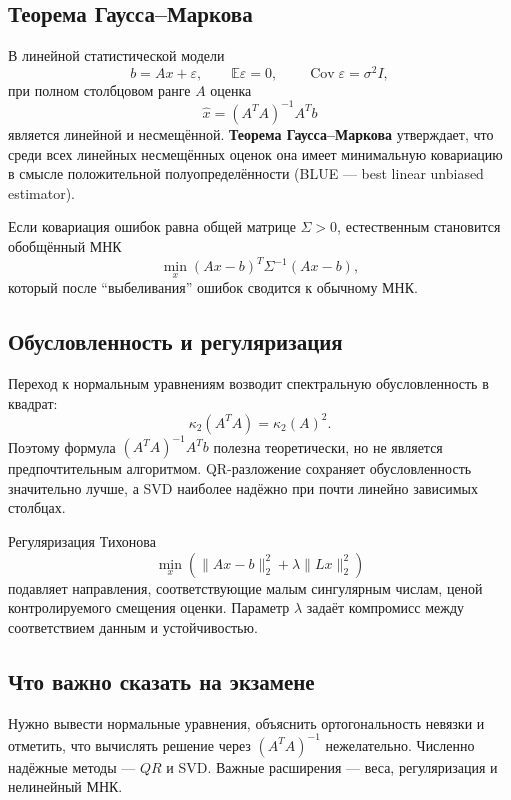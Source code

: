 \subsection{Теорема Гаусса--Маркова}

В линейной статистической модели
\[
    b=Ax+\varepsilon,
    \qquad
    \mathbb E\varepsilon=0,
    \qquad
    \operatorname{Cov}\varepsilon=\sigma^2I,
\]
при полном столбцовом ранге $A$ оценка
\[
    \widehat x=(A^TA)^{-1}A^Tb
\]
является линейной и несмещённой. \textbf{Теорема Гаусса--Маркова} утверждает, что среди
всех линейных несмещённых оценок она имеет минимальную ковариацию в смысле
положительной полуопределённости (BLUE --- best linear unbiased estimator).

Если ковариация ошибок равна общей матрице $\Sigma>0$, естественным становится
обобщённый МНК
\[
    \min_x (Ax-b)^T\Sigma^{-1}(Ax-b),
\]
который после ``выбеливания'' ошибок сводится к обычному МНК.

\subsection{Обусловленность и регуляризация}

Переход к нормальным уравнениям возводит спектральную обусловленность в квадрат:
\[
    \kappa_2(A^TA)=\kappa_2(A)^2.
\]
Поэтому формула $(A^TA)^{-1}A^Tb$ полезна теоретически, но не является предпочтительным
алгоритмом. QR-разложение сохраняет обусловленность значительно лучше, а SVD наиболее
надёжно при почти линейно зависимых столбцах.

Регуляризация Тихонова
\[
    \min_x\left(\|Ax-b\|_2^2+\lambda\|Lx\|_2^2\right)
\]
подавляет направления, соответствующие малым сингулярным числам, ценой контролируемого
смещения оценки. Параметр $\lambda$ задаёт компромисс между соответствием данным и
устойчивостью.

\subsection{Что важно сказать на экзамене}

Нужно вывести нормальные уравнения, объяснить ортогональность невязки и отметить,
что вычислять решение через $(A^TA)^{-1}$ нежелательно. Численно надёжные методы
--- $QR$ и SVD. Важные расширения --- веса, регуляризация и нелинейный МНК.

\newpage